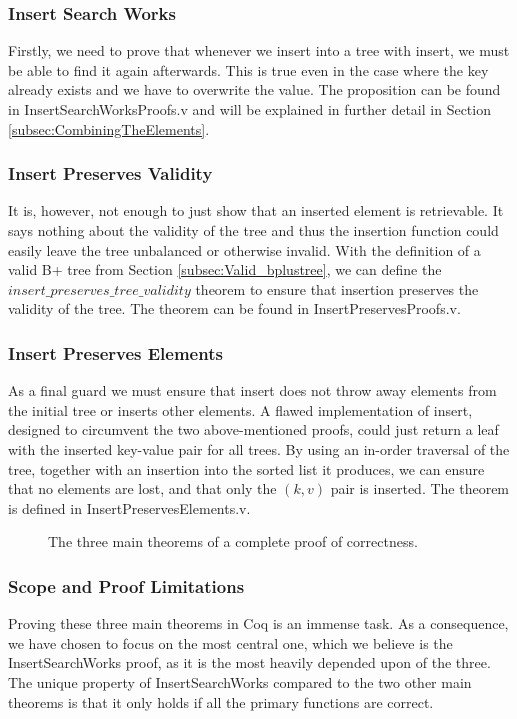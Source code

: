 \subsubsection{Insert Search Works}
Firstly, we need to prove that whenever we insert into a tree with insert, we must be able to find it again afterwards. This is true even in the case where the key already exists and we have to overwrite the value. The proposition can be found in InsertSearchWorksProofs.v and will be explained in further detail in Section \ref{subsec:CombiningTheElements}.

\subsubsection{Insert Preserves Validity}
It is, however, not enough to just show that an inserted element is retrievable. It says nothing about the validity of the tree and thus the insertion function could easily leave the tree unbalanced or otherwise invalid. With the definition of a valid B+ tree from Section \ref{subsec:Valid_bplustree}, we can define the $insert\_preserves\_tree\_validity$ theorem to ensure that insertion preserves the validity of the tree. The theorem can be found in InsertPreservesProofs.v.

\subsubsection{Insert Preserves Elements}
As a final guard we must ensure that insert does not throw away elements from the initial tree or inserts other elements. A flawed implementation of insert, designed to circumvent the two above-mentioned proofs, could just return a leaf with the inserted key-value pair for all trees. By using an in-order traversal of the tree, together with an insertion into the sorted list it produces, we can ensure that no elements are lost, and that only the $(k, v)$ pair is inserted. The theorem is defined in InsertPreservesElements.v.

\begin{figure}
\centering

\caption{The three main theorems of a complete proof of correctness.}
\label{fig:three_main_proofs}
\end{figure}

\subsubsection{Scope and Proof Limitations}
Proving these three main theorems in Coq is an immense task. As a consequence, we have chosen to focus on the most central one, which we believe is the InsertSearchWorks proof, as it is the most heavily depended upon of the three. The unique property of InsertSearchWorks compared to the two other main theorems is that it only holds if all the primary functions are correct.


